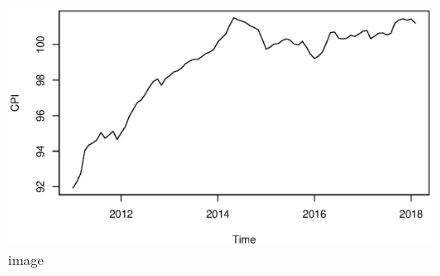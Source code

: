 \documentclass[landscape, 20pt]{extreport}
\theoremstyle{definition}
\theoremstyle{definition}
\theoremstyle{definition}
\theoremstyle{definition}
\theoremstyle{remark}
\begin{document}
\begin{figure}
\centering
\includegraphics{CPIGraph.eps}
\caption{image}
\end{figure}
\end{document}
